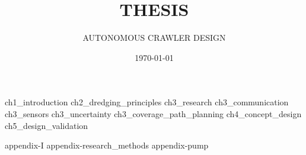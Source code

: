 \documentclass[english, businessunit=mti, status=final]{IHCreport}
\title{THESIS}
\subtitle{AUTONOMOUS CRAWLER DESIGN}
\date{\today}
\begin{document}

%
\begin{front}[]
\end{front}

\begin{main}
 {ch1_introduction}
 {ch2_dredging_principles}
 {ch3_research}
 {ch3_communication}
 {ch3_sensors}
 {ch3_uncertainty}
 {ch3_coverage_path_planning}
 {ch4_concept_design}
 {ch5_design_validation}
\end{main}

\begin{back}[]
 \printglossaries{}
 \printbibliography[title={BIBLIOGRAPHY}]
 \begin{app}
  {appendix-I}
  {appendix-research_methods}
  {appendix-pump}
 \end{app}
\end{back}
\end{document}

